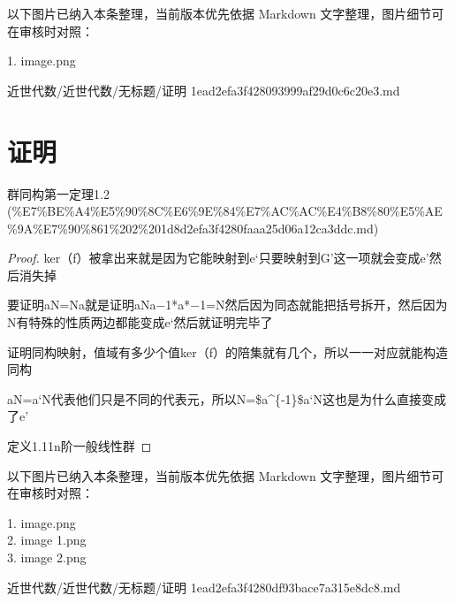 \begin{note}[关联图片]
以下图片已纳入本条整理，当前版本优先依据 Markdown 文字整理，图片细节可在审核时对照：

1. image.png\\

\end{note}

\begin{note}[来源路径]

近世代数/近世代数/无标题/证明 1ead2efa3f428093999af29d0c6c20e3.md

\end{note}

\section*{证明}

\begin{note}[来源上级主题]

群同构第一定理1.2 (\%E7\%BE\%A4\%E5\%90\%8C\%E6\%9E\%84\%E7\%AC\%AC\%E4\%B8\%80\%E5\%AE\%9A\%E7\%90\%861\%202\%201d8d2efa3f4280faaa25d06a12ca3ddc.md)

\end{note}

\begin{proof}

ker（f）被拿出来就是因为它能映射到e‘只要映射到G’这一项就会变成e’然后消失掉

要证明aN=Na就是证明aNa−1*a*−1﻿=N然后因为同态就能把括号拆开，然后因为N有特殊的性质两边都能变成e‘然后就证明完毕了

证明同构映射，值域有多少个值ker（f）的陪集就有几个，所以一一对应就能构造同构

aN=a‘N代表他们只是不同的代表元，所以N=\$a\textasciicircum{}\{-1\}\$a‘N这也是为什么直接变成了e’

定义1.11n阶一般线性群

\end{proof}

\begin{note}[关联图片]
以下图片已纳入本条整理，当前版本优先依据 Markdown 文字整理，图片细节可在审核时对照：

1. image.png\\
2. image 1.png\\
3. image 2.png\\

\end{note}

\begin{note}[来源路径]

近世代数/近世代数/无标题/证明 1ead2efa3f4280df93bace7a315e8dc8.md

\end{note}

